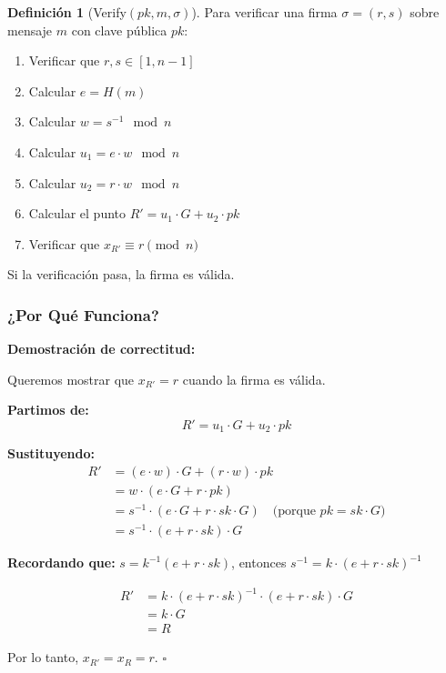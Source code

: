 \documentclass[11pt,a4paper,twoside,openright]{book}
\theoremstyle{definition}
\newtheorem{definition}{Definición}[chapter]
\theoremstyle{plain}
\theoremstyle{remark}
\begin{document}
\begin{definition}[Verify$(pk, m, \sigma)$]
Para verificar una firma $\sigma = (r, s)$ sobre mensaje $m$ con clave pública $pk$:

\begin{enumerate}
    \item Verificar que $r, s \in [1, n-1]$
    
    \item Calcular $e = H(m)$
    
    \item Calcular $w = s^{-1} \mod n$
    
    \item Calcular $u_1 = e \cdot w \mod n$
    
    \item Calcular $u_2 = r \cdot w \mod n$
    
    \item Calcular el punto $R' = u_1 \cdot G + u_2 \cdot pk$
    
    \item Verificar que $x_{R'} \equiv r \pmod{n}$
\end{enumerate}

Si la verificación pasa, la firma es válida.
\end{definition}

\subsubsection{¿Por Qué Funciona?}

\begin{mathnote}
\textbf{Demostración de correctitud:}

Queremos mostrar que $x_{R'} = r$ cuando la firma es válida.

\textbf{Partimos de:}
\[ R' = u_1 \cdot G + u_2 \cdot pk \]

\textbf{Sustituyendo:}
\begin{align}
R' &= (e \cdot w) \cdot G + (r \cdot w) \cdot pk \\
   &= w \cdot (e \cdot G + r \cdot pk) \\
   &= s^{-1} \cdot (e \cdot G + r \cdot sk \cdot G) \quad \text{(porque } pk = sk \cdot G\text{)} \\
   &= s^{-1} \cdot (e + r \cdot sk) \cdot G
\end{align}

\textbf{Recordando que:} $s = k^{-1}(e + r \cdot sk)$, entonces $s^{-1} = k \cdot (e + r \cdot sk)^{-1}$

\begin{align}
R' &= k \cdot (e + r \cdot sk)^{-1} \cdot (e + r \cdot sk) \cdot G \\
   &= k \cdot G \\
   &= R
\end{align}

Por lo tanto, $x_{R'} = x_R = r$. $\square$
\end{mathnote}
\end{document}
